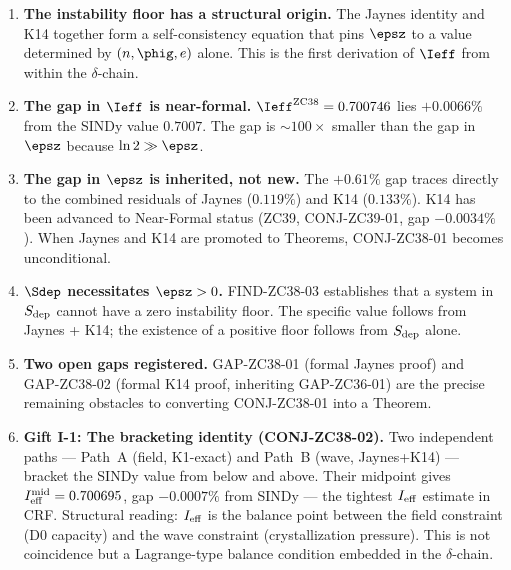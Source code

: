 \documentclass[12pt, a4paper]{article}
\begin{document}
\begin{enumerate}[leftmargin=*]

\item \textbf{The instability floor has a structural origin.}
The Jaynes identity and K14 together form a self-consistency equation
that pins $\epsz$ to a value determined by $(n, \phig, e)$ alone.
This is the first derivation of $\Ieff$ from within the $\delta$-chain.

\item \textbf{The gap in $\Ieff$ is near-formal.}
$\Ieff^{\rm ZC38} = 0.700746$ lies $+0.0066\%$ from the SINDy value
$0.7007$. The gap is $\sim 100\times$ smaller than the gap in $\epsz$
because $\ln 2 \gg \epsz$.

\item \textbf{The gap in $\epsz$ is inherited, not new.}
The $+0.61\%$ gap traces directly to the combined residuals of
Jaynes ($0.119\%$) and K14 ($0.133\%$). K14 has been advanced to
Near-Formal status (ZC39, CONJ-ZC39-01, gap $-0.0034\%$).
When Jaynes and K14 are promoted to Theorems, CONJ-ZC38-01 becomes unconditional.

\item \textbf{$\Sdep$ necessitates $\epsz > 0$.}
FIND-ZC38-03 establishes that a system in $S_{\rm dep}$ cannot have
a zero instability floor. The specific value follows from Jaynes + K14;
the existence of a positive floor follows from $S_{\rm dep}$ alone.

\item \textbf{Two open gaps registered.}
GAP-ZC38-01 (formal Jaynes proof) and GAP-ZC38-02 (formal K14 proof,
inheriting GAP-ZC36-01) are the precise remaining obstacles to
converting CONJ-ZC38-01 into a Theorem.

\item \textbf{Gift I-1: The bracketing identity (CONJ-ZC38-02).}
Two independent paths --- Path~A (field, K1-exact) and Path~B (wave, Jaynes+K14) ---
bracket the SINDy value from below and above.
Their midpoint gives $I_{\rm eff}^{\rm mid} = 0.700695$,
gap $-0.0007\%$ from SINDy --- the tightest $I_{\rm eff}$ estimate in CRF.
Structural reading: $I_{\rm eff}$ is the balance point between the
field constraint (D0 capacity) and the wave constraint (crystallization pressure).
This is not coincidence but a Lagrange-type balance condition embedded in the $\delta$-chain.

\end{enumerate}
\end{document}
